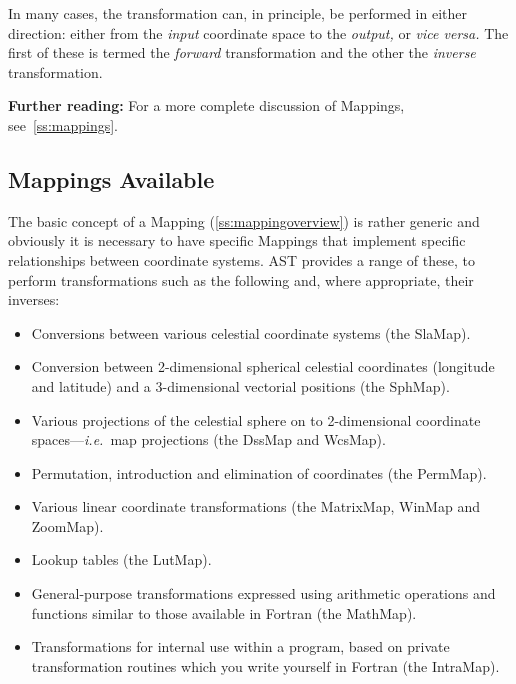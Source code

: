 \documentclass[twoside,11pt]{article}
\newcommand{\htmlref}[2]{#1}
\newcommand{\secref}[1]{\S\ref{#1}}
\renewcommand{\secref}[1]{\ref{#1}}
\begin{document}
In many cases, the transformation can, in principle, be performed in
either direction: either from the {\em{input}} coordinate space to the
{\em{output,}} or {\em{vice versa.}} The first of these is termed the
{\em{forward}} transformation and the other the {\em{inverse}}
transformation.

{\bf{Further reading:}} For a more complete discussion of Mappings,
see~\secref{ss:mappings}.

\subsection{\label{ss:mappingselection}Mappings Available}

The basic concept of a \htmlref{Mapping}{Mapping} (\secref{ss:mappingoverview}) is rather
generic and obviously it is necessary to have specific Mappings that
implement specific relationships between coordinate systems. AST
provides a range of these, to perform transformations such as the
following and, where appropriate, their inverses:

\begin{itemize}
\item Conversions between various celestial coordinate systems (the
\htmlref{SlaMap}{SlaMap}).

\item Conversion between 2-dimensional spherical celestial coordinates
(longitude and latitude) and a 3-dimensional vectorial positions (the \htmlref{SphMap}{SphMap}).

\item Various projections of the celestial sphere on to 2-dimensional
coordinate spaces---{\em{i.e.}}\ map projections (the \htmlref{DssMap}{DssMap} and \htmlref{WcsMap}{WcsMap}).

\item Permutation, introduction and elimination of coordinates (the
\htmlref{PermMap}{PermMap}).

\item Various linear coordinate transformations (the \htmlref{MatrixMap}{MatrixMap}, \htmlref{WinMap}{WinMap}
and \htmlref{ZoomMap}{ZoomMap}).

\item Lookup tables (the \htmlref{LutMap}{LutMap}).

\item General-purpose transformations expressed using arithmetic
operations and functions similar to those available in Fortran (the
\htmlref{MathMap}{MathMap}).

\item Transformations for internal use within a program, based on
private transformation routines which you write yourself in Fortran
(the \htmlref{IntraMap}{IntraMap}).
\end{itemize}
\end{document}
